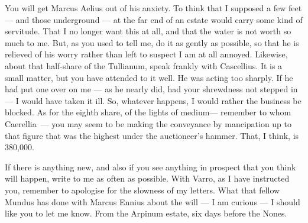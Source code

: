  You will get Marcus Aelius out of his anxiety. To think that I supposed a few feet --- and those underground --- at the far end of an estate would carry some kind of servitude. That I no longer want this at all, and that the water is not worth so much to me. But, as you used to tell me, do it as gently as possible, so that he is relieved of his worry rather than left to suspect I am at all annoyed. Likewise, about that half-share of the Tullianum, speak frankly with Cascellius. It is a small matter, but you have attended to it well. He was acting too sharply. If he had put one over on me --- as he nearly did, had your shrewdness not stepped in --- I would have taken it ill. So, whatever happens, I would rather the business be blocked. As for the eighth share, \dag of the lights of medium\dag --- remember to whom \dag Caerellia\dag\ --- you may seem to be making the conveyance by mancipation up to that figure that was the highest under the auctioneer's hammer. That, I think, is 380,000.

 If there is anything new, and also if you see anything in prospect that you think will happen, write to me as often as possible. With Varro, as I have instructed you, remember to apologise for the slowness of my letters. What that fellow Mundus has done with Marcus Ennius about the will --- I am curious --- I should like you to let me know. From the Arpinum estate, six days before the Nones.
